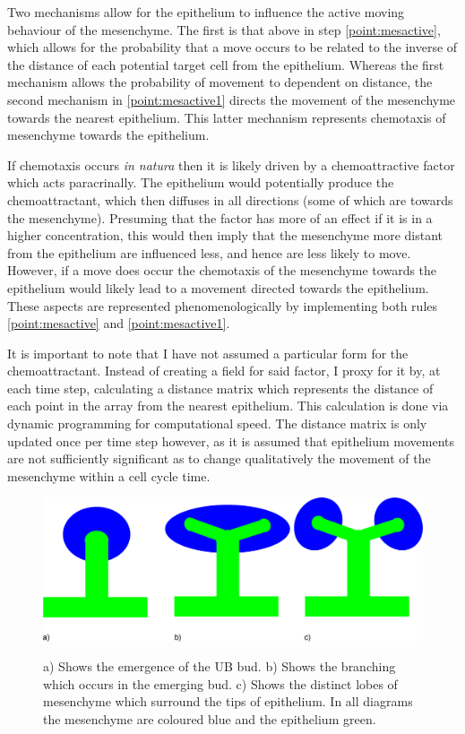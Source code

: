 \documentclass[pdftex,10pt,a4paper]{article}
\begin{document}
Two mechanisms allow for the epithelium to influence the active moving behaviour of the mesenchyme. The first is that above in step \ref{point:mesactive}, which allows for the probability that a move occurs to be related to the inverse of the distance of each potential target cell from the epithelium. Whereas the first mechanism allows the probability of movement to dependent on distance, the second mechanism in \ref{point:mesactive1} directs the movement of the mesenchyme towards the nearest epithelium. This latter mechanism represents chemotaxis of mesenchyme towards the epithelium.

If chemotaxis occurs \textit{in natura} then it is likely driven by a chemoattractive factor which acts paracrinally. The epithelium would potentially produce the chemoattractant, which then diffuses in all directions (some of which are towards the mesenchyme). Presuming that the factor has more of an effect if it is in a higher concentration, this would then imply that the mesenchyme more distant from the epithelium are influenced less, and hence are less likely to move. However, if a move does occur the chemotaxis of the mesenchyme towards the epithelium would likely lead to a movement directed towards the epithelium. These aspects are represented phenomenologically by implementing both rules \ref{point:mesactive} and \ref{point:mesactive1}.

It is important to note that I have not assumed a particular form for the chemoattractant. Instead of creating a field for said factor, I proxy for it by, at each time step, calculating a distance matrix which represents the distance of each point in the array from the nearest epithelium. This calculation is done via dynamic programming for computational speed. The distance matrix is only updated once per time step however, as it is assumed that epithelium movements are not sufficiently significant as to change qualitatively the movement of the mesenchyme within a cell cycle time.

\begin{figure}[t] 
\centering
\scalebox{0.35} 
{\includegraphics{UB_branch.eps}}
\caption{a) Shows the emergence of the UB bud. b) Shows the branching which occurs in the emerging bud. c) Shows the distinct lobes of mesenchyme which surround the tips of epithelium. In all diagrams the mesenchyme are coloured blue and the epithelium green.}\label{fig:UB_branch}
\end{figure} 
\end{document}
